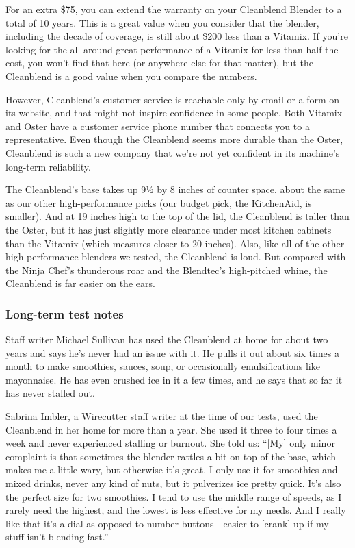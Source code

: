 For an extra \$75, you can extend the warranty on your Cleanblend
Blender to a total of 10 years. This is a great value when you consider
that the blender, including the decade of coverage, is still about \$200
less than a Vitamix. If you're looking for the all-around great
performance of a Vitamix for less than half the cost, you won't find
that here (or anywhere else for that matter), but the Cleanblend is a
good value when you compare the numbers.

However, Cleanblend's customer service is reachable only by email or a
form on its website, and that might not inspire confidence in some
people. Both Vitamix and Oster have a customer service phone number that
connects you to a representative. Even though the Cleanblend seems more
durable than the Oster, Cleanblend is such a new company that we're not
yet confident in its machine's long-term reliability.

The Cleanblend's base takes up 9½ by 8 inches of counter space, about
the same as our other high-performance picks (our budget pick, the
KitchenAid, is smaller). And at 19 inches high to the top of the lid,
the Cleanblend is taller than the Oster, but it has just slightly more
clearance under most kitchen cabinets than the Vitamix (which measures
closer to 20 inches). Also, like all of the other high-performance
blenders we tested, the Cleanblend is loud. But compared with the Ninja
Chef's thunderous roar and the Blendtec's high-pitched whine, the
Cleanblend is far easier on the ears.

\hypertarget{long-term-test-notes-2}{%
\subsubsection{Long-term test notes}\label{long-term-test-notes-2}}

Staff writer Michael Sullivan has used the Cleanblend at home for about
two years and says he's never had an issue with it. He pulls it out
about six times a month to make smoothies, sauces, soup, or occasionally
emulsifications like mayonnaise. He has even crushed ice in it a few
times, and he says that so far it has never stalled out.

Sabrina Imbler, a Wirecutter staff writer at the time of our tests, used
the Cleanblend in her home for more than a year. She used it three to
four times a week and never experienced stalling or burnout. She told
us: ``{[}My{]} only minor complaint is that sometimes the blender
rattles a bit on top of the base, which makes me a little wary, but
otherwise it's great. I only use it for smoothies and mixed drinks,
never any kind of nuts, but it pulverizes ice pretty quick. It's also
the perfect size for two smoothies. I tend to use the middle range of
speeds, as I rarely need the highest, and the lowest is less effective
for my needs. And I really like that it's a dial as opposed to number
buttons---easier to {[}crank{]} up if my stuff isn't blending fast.''

